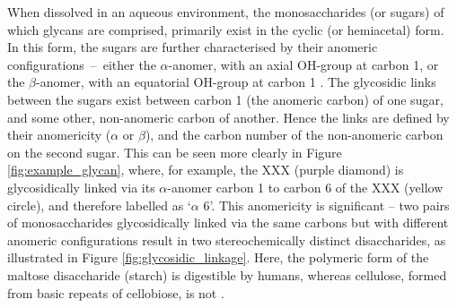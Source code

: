 \documentclass[12pt,a4paper]{article}
\makeatletter
\newcounter{subfloat}
\newcommand{\image}[2]{%
  \stepcounter{subfloat}%
  \begin{tabular}[t]{@{}c@{}}
  #2 \\
  \end{tabular}%
}
\makeatother
\begin{document}
When dissolved in an aqueous environment, the monosaccharides (or sugars) of which glycans are comprised, primarily exist in the cyclic (or hemiacetal) form. In this form, the sugars are further characterised by their anomeric \mbox{configurations -- either} the $\alpha$-anomer, with an axial OH-group at carbon 1, or the $\beta$-anomer, with an equatorial OH-group at carbon 1 \citep{SONG2012137}. The glycosidic links between the sugars exist between carbon 1 (the anomeric carbon) of one sugar, and some other, non-anomeric carbon of another. Hence the links are defined by their anomericity ($\alpha$ or $\beta$), and the carbon number of the non-anomeric carbon on the second sugar. This can be seen more clearly in Figure \ref{fig:example_glycan}, where, for example, the XXX (purple diamond) is glycosidically linked via its $\alpha$-anomer carbon 1 to carbon 6 of the XXX (yellow circle), and therefore labelled as `$\alpha$ 6'. This anomericity is significant -- two pairs of monosaccharides glycosidically linked via the same carbons but with different anomeric configurations result in two stereochemically distinct disaccharides, as illustrated in Figure \ref{fig:glycosidic_linkage}. Here, the polymeric form of the maltose disaccharide (starch) is digestible by humans, whereas cellulose, formed from basic repeats of cellobiose, is not \citep{SONG2012137}.\\

\end{document}
